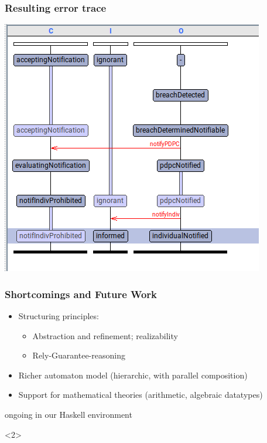 \documentclass{beamer}
\begin{document}
\begin{frame}[fragile]\frametitle{Resulting error trace}

  \begin{center}
    \includegraphics[scale=0.6]{Figures/uppaal_swimlane.png}
  \end{center}

\end{frame}

\begin{frame}[fragile]\frametitle{Shortcomings and Future Work}

  \begin{itemize}
  \item Structuring principles:
    \begin{itemize}
    \item Abstraction and refinement; realizability
    \item Rely-Guarantee-reasoning
    \end{itemize}
  \item Richer automaton model (hierarchic, with parallel composition)
  \item Support for mathematical theories (arithmetic, algebraic datatypes)
  \end{itemize}

  \vspace{3mm}
   ongoing in our Haskell environment

  \vspace{3mm}
  \begin{onlyenv}<2>
  \end{onlyenv}

\end{frame}
\end{document}
